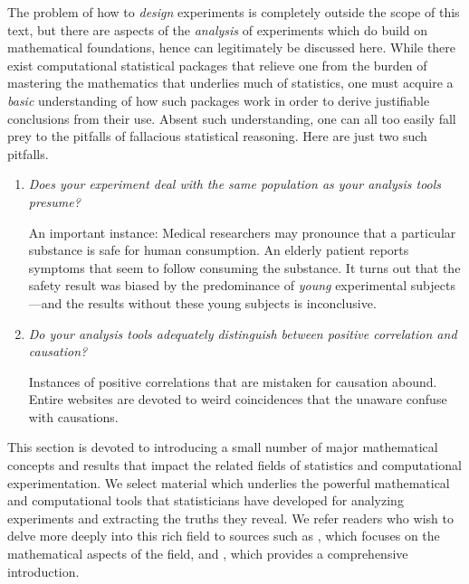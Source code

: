 The problem of how to {\em design} experiments is completely outside
the scope of this text, but there are aspects of the {\em analysis} of
experiments which do build on mathematical foundations, hence can
legitimately be discussed here.  While there exist computational
statistical packages that relieve one from the burden of mastering the
mathematics that underlies much of statistics, one must acquire a {\em
  basic} understanding of how such packages work in order to derive
justifiable conclusions from their use.  Absent such understanding,
one can all too easily fall prey to the pitfalls of fallacious statistical reasoning.  Here are just two such pitfalls.
\begin{enumerate}
\item
{\em Does your experiment deal with the same population as your analysis tools presume?} 

\smallskip

An important instance: Medical researchers may pronounce that a particular substance is safe for human consumption.  An elderly patient reports symptoms that seem to follow consuming the substance.  It turns out that the safety result was biased by the predominance of {\em young} experimental subjects---and the results without these young subjects is inconclusive.

\medskip\item
{\em Do your analysis tools adequately distinguish between {\em positive correlation} and {\em causation}?}

\smallskip

Instances of positive correlations that are mistaken for causation abound.  Entire websites are devoted to weird coincidences that the unaware confuse with causations.
\end{enumerate}

This section is devoted to introducing a small number of major mathematical concepts and results that impact the related fields of statistics and computational experimentation.  We select material which underlies the powerful mathematical and computational tools that statisticians have developed for analyzing experiments and extracting the truths they reveal.  We refer readers who wish to delve more deeply into this rich field to sources such as \cite{Hoel58}, which focuses on the mathematical aspects of the field, and \cite{Bremaud17}, which provides a comprehensive introduction.

\bigskip

